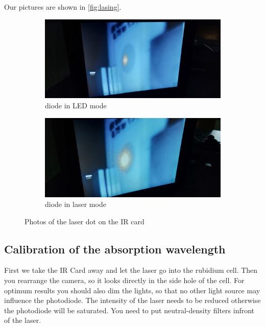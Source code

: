 Our pictures are shown in \autoref{fig:lasing}.

\begin{figure}
    \centering
    \begin{subfigure}[t]{0.45\textwidth}
        \centering
        \includegraphics[width=\textwidth]{images/photo_not_lasing.jpg}
        \caption{diode in LED mode}
        \label{fig:notlase}
    \end{subfigure}
    \begin{subfigure}[t]{0.45\textwidth}
        \centering
        \includegraphics[width=\textwidth]{images/photo_lasing.jpg}
        \caption{diode in laser mode}
        \label{fig:lase}
    \end{subfigure}
    \caption{Photos of the laser dot on the IR card}
    \label{fig:lasing}
\end{figure}

\subsection{Calibration of the absorption wavelength}
\label{ssec:exe2}

First we take the IR Card away and let the laser go into the rubidium cell. 
Then you rearrange the camera, so it looks directly in the side hole of the cell. 
For optimum results you should also dim the lights, so that no other light source may influence the photodiode.
The intensity of the laser needs to be reduced otherwise the photodiode will be saturated.
You need to put neutral-density filters infront of the laser.

